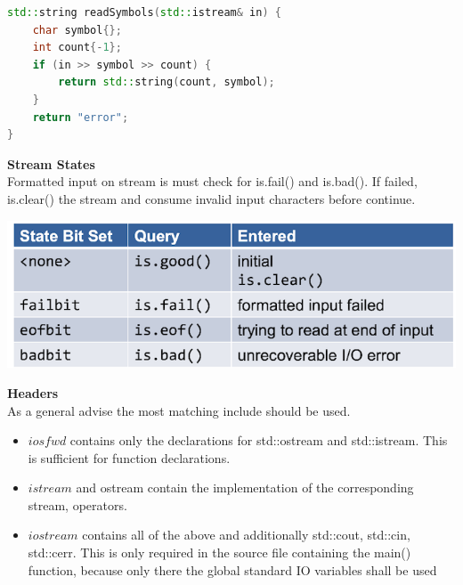 \begin{lstlisting}[language=C++]
std::string readSymbols(std::istream& in) {
	char symbol{};
	int count{-1};
	if (in >> symbol >> count) {
		return std::string(count, symbol); 
	} 
	return "error";
}
\end{lstlisting}

\textbf{Stream States}\\
Formatted input on stream  is must check for is.fail() and is.bad(). If failed, is.clear() the stream and consume invalid input characters before continue.
\begin{center}
\includegraphics[width=0.75\linewidth]{images/streamstates}
\end{center}

\textbf{Headers}\\
As a general advise the most matching include should be used.
\begin{itemize}
  \itemsep -0.5em 
  \item $iosfwd$ contains only the declarations for std::ostream and std::istream. This is sufficient for function declarations.
  \item $istream$ and ostream contain the implementation of the corresponding stream, operators.
  \item $iostream$ contains all of the above and additionally std::cout, std::cin, std::cerr. This is only required in the source file containing the main() function, because only there the global standard IO variables shall be used

\end{itemize}
\break